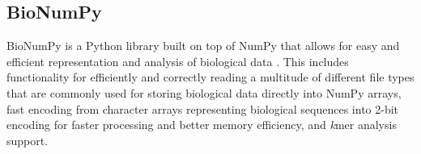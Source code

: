 \subsection{BioNumPy} \label{background:bionumpy}
BioNumPy is a Python library built on top of NumPy that allows for easy and efficient representation and analysis of biological data \cite{bionumpy}.
This includes functionality for efficiently and correctly reading a multitude of different file types that are commonly used for storing biological data directly into NumPy arrays, fast encoding from character arrays representing biological sequences into 2-bit encoding for faster processing and better memory efficiency, and \textit{k}mer analysis support.
